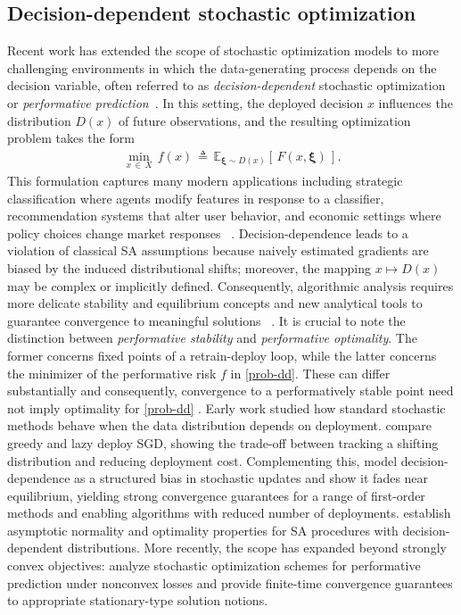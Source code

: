 \documentclass[11pt,reqno]{amsart}
\newcommand{\1}{{\bf 1}}
\newcommand{\2}{{\bf 2}}
\newcommand{\bxi}{\boldsymbol{\xi}}
\numberwithin{equation}{section}
\theoremstyle{remark}
\begin{document}
		\subsection{Decision-dependent stochastic optimization}
		Recent work has extended the scope of {stochastic optimization models} to more challenging environments in which the data-generating process depends on the decision variable, often referred to as \emph{decision-dependent} stochastic optimization or \emph{performative prediction}~\cite{perdomo2020performative, mendler2020stochastic, drusvyatskiy2023stochastic}. In this setting, the deployed decision $x$ influences the distribution $D(x)$ of future observations, and the resulting optimization problem takes the form
		\begin{align}
			\min_{x \, \in \, X} \, f(x) \, \triangleq \, \mathbb{E}_{\bxi\sim D(x)}\left[\, F(x,\bxi)\, \right]. \label{prob-dd}
		\end{align}
		This formulation captures many modern applications including strategic classification where agents modify features in response to a classifier, recommendation systems that alter user behavior, and economic settings where policy choices change market responses~ \cite{perdomo2020performative}. Decision-dependence leads to a violation of classical SA assumptions because naively estimated gradients are biased by the induced distributional shifts; moreover, the mapping $x \mapsto D(x)$ may be complex or implicitly defined. Consequently, algorithmic analysis requires more delicate stability and equilibrium concepts and new analytical tools to guarantee convergence to meaningful solutions~ \cite{drusvyatskiy2023stochastic}.  It is crucial to note the distinction between \emph{performative stability} and \emph{performative optimality}. The former concerns fixed points of a retrain-deploy loop, while the latter concerns the minimizer of the performative risk $f$ in \eqref{prob-dd}. These can differ substantially and consequently, convergence to a performatively stable point need not imply optimality for \eqref{prob-dd} \cite{perdomo2020performative, miller2021outside}. Early work studied how standard stochastic methods behave when the data distribution depends on deployment. \cite{mendler2020stochastic} compare greedy and lazy deploy SGD, showing the trade-off between tracking a shifting distribution and reducing deployment cost. Complementing this, \cite{drusvyatskiy2023stochastic} model decision-dependence as a structured bias in stochastic updates and show it fades near equilibrium, yielding strong convergence guarantees for a range of first-order methods and enabling algorithms with reduced number of deployments. \cite{cutler2024stochastic} establish asymptotic normality and optimality properties for SA procedures with decision-dependent distributions. More recently, the scope has expanded beyond strongly convex objectives: \cite{li2024stochastic} analyze stochastic optimization schemes for performative prediction under nonconvex losses and provide finite-time convergence guarantees to appropriate stationary-type solution notions.
\end{document}
